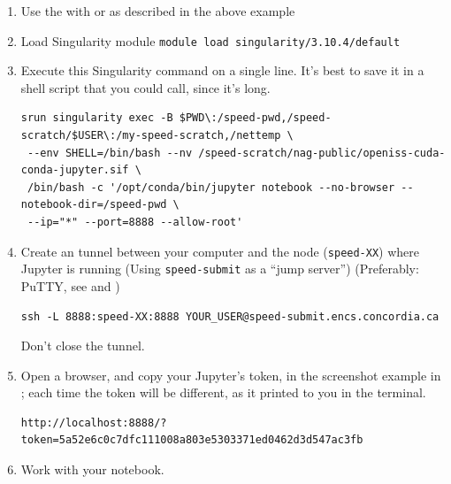 \begin{enumerate}
\item
Use the  with  or  as described in the above example

\item
Load Singularity module
\verb+module load singularity/3.10.4/default+

\item
Execute this Singularity command on a single line. It's best to save it in a shell script
that you could call, since it's long.
\scriptsize
\begin{verbatim}
srun singularity exec -B $PWD\:/speed-pwd,/speed-scratch/$USER\:/my-speed-scratch,/nettemp \
 --env SHELL=/bin/bash --nv /speed-scratch/nag-public/openiss-cuda-conda-jupyter.sif \
 /bin/bash -c '/opt/conda/bin/jupyter notebook --no-browser --notebook-dir=/speed-pwd \
 --ip="*" --port=8888 --allow-root'
\end{verbatim}
\normalsize

\item
Create an  tunnel between your computer and the node (\texttt{speed-XX}) where Jupyter is
running (Using \texttt{speed-submit} as a ``jump server'') (Preferably: PuTTY, see  and )
\begin{verbatim}
ssh -L 8888:speed-XX:8888 YOUR_USER@speed-submit.encs.concordia.ca
\end{verbatim}
Don't close the tunnel.

\item
Open a browser, and copy your Jupyter's token, in the screenshot
example in ; each time the token will be different,
as it printed to you in the terminal.

\small
\begin{verbatim}
http://localhost:8888/?token=5a52e6c0c7dfc111008a803e5303371ed0462d3d547ac3fb
\end{verbatim}
\normalsize

\item
Work with your notebook.

\end{enumerate}

